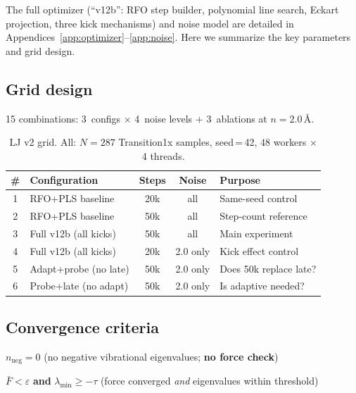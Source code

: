 \documentclass[11pt,a4paper]{article}
\theoremstyle{definition}
\begin{document}
The full optimizer (``v12b'': RFO step builder, polynomial line search,
Eckart projection, three kick mechanisms) and noise model are detailed in
Appendices~\ref{app:optimizer}--\ref{app:noise}.  Here we summarize the
key parameters and grid design.

\subsection{Grid design}

15 combinations: 3~configs $\times$ 4~noise levels $+$ 3~ablations at
$n{=}2.0$\,\AA.

\begin{table}[h]
\centering\small
\begin{tabular}{clccl}
\toprule
\# & Configuration & Steps & Noise & Purpose \\
\midrule
1 & RFO+PLS baseline       & 20k & all       & Same-seed control \\
2 & RFO+PLS baseline       & 50k & all       & Step-count reference \\
3 & Full v12b (all kicks)  & 50k & all       & Main experiment \\
\midrule
4 & Full v12b (all kicks)  & 20k & 2.0 only  & Kick effect control \\
5 & Adapt+probe (no late)  & 50k & 2.0 only  & Does 50k replace late? \\
6 & Probe+late (no adapt)  & 50k & 2.0 only  & Is adaptive needed? \\
\bottomrule
\end{tabular}
\caption{LJ v2 grid.  All: $N{=}287$ Transition1x samples, seed\,=\,42,
  48 workers $\times$ 4 threads.}
\label{tab:grid}
\end{table}

\subsection{Convergence criteria}

\begin{description}[nosep]
  \item[\color{successgreen}Strict:] $n_\text{neg} = 0$ \quad
    (no negative vibrational eigenvalues; \textbf{no force check})
  \item[\color{ljblue}Relaxed:] $\bar{F} < \varepsilon$ \textbf{and}
    $\lambda_\text{min} \geq -\tau$ \quad
    (force converged \emph{and} eigenvalues within threshold)
\end{description}
\end{document}
